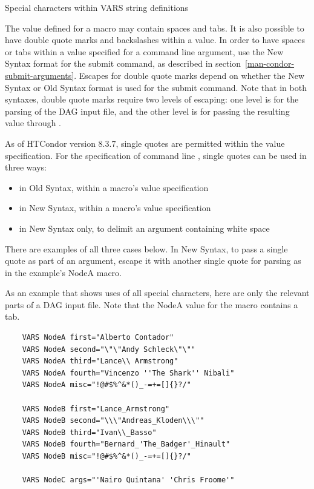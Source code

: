 \begin{description}
\item[Special characters within VARS string definitions]
\end{description}

The value defined for a macro may contain spaces and tabs.
It is also possible to have double quote marks and
backslashes within a value.
In order to have spaces or tabs within a value specified for a command line
argument,
use the New Syntax format for the  submit command,
as described in section~\ref{man-condor-submit-arguments}.
Escapes for double quote marks
depend on whether the New Syntax or Old Syntax format is used
for the  submit command.
Note that in both syntaxes,
double quote marks require two levels of escaping:
one level is for the parsing of the DAG input file, and the other level is for
passing the resulting value through .

As of HTCondor version 8.3.7, 
single quotes are permitted within the value specification.  
For the specification of command line , 
single quotes can be used in three ways:
\begin{itemize}
\item in Old Syntax, within a macro's value specification
\item in New Syntax, within a macro's value specification
\item in New Syntax only, to delimit an argument containing white space 
\end{itemize}
There are examples of all three cases below.  
In New Syntax, 
to pass a single quote as part of an argument, 
escape it with another single quote
for  parsing as in the example's NodeA  macro.

As an example that shows uses of all special characters, 
here are only the relevant parts of a DAG input file.
Note that the NodeA value for the macro  contains a tab.
\footnotesize
\begin{verbatim}
    VARS NodeA first="Alberto Contador"
    VARS NodeA second="\"\"Andy	Schleck\"\""
    VARS NodeA third="Lance\\ Armstrong"
    VARS NodeA fourth="Vincenzo ''The Shark'' Nibali"
    VARS NodeA misc="!@#$%^&*()_-=+=[]{}?/"
    
    VARS NodeB first="Lance_Armstrong"
    VARS NodeB second="\\\"Andreas_Kloden\\\""
    VARS NodeB third="Ivan\\_Basso"
    VARS NodeB fourth="Bernard_'The_Badger'_Hinault"
    VARS NodeB misc="!@#$%^&*()_-=+=[]{}?/"

    VARS NodeC args="'Nairo Quintana' 'Chris Froome'"
\end{verbatim}
\normalsize

